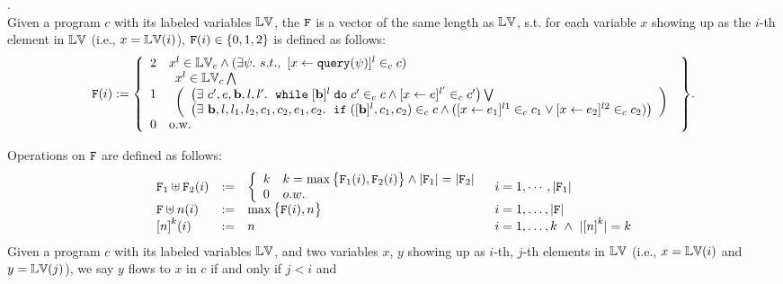 {
\begin{defn}.
\\
Given a program  ${c}$ with its labeled variables $\mathbb{LV}$, the $\mathtt{F}$ is a vector of the same length as $\mathbb{LV}$, s.t. for each variable ${x}$ showing up as the $i$-th element in $\mathbb{LV}$ (i.e., ${x} = \mathbb{LV}(i)$), 
$\mathtt{F}(i) \in \{0, 1, 2\}$ is defined as follows:
%
%
\[
\flag(i) := 
\left\{
\begin{array}{ll}
2 & 
{x^l} \in \lvar_{c} \land 
(\exists {\qexpr}. ~ s.t., ~
[\assign{{x}}{\query({\qexpr})}]^l \in_{c} {c})
\\
1 &  
\begin{array}{l}
{x^l} \in \lvar_{c} \bigwedge \\
\left(
\begin{array}{l}
\big(\exists  ~ {c'}, {\expr}, \sbexpr, l, l'. ~
	\ewhile [\sbexpr]^l \edo {c'} \in_{c} {c}
	\land 
	[{\assign{x}{\expr}}]^{l'} \in_{c}  {c'}
\big) \bigvee
\\
\big(\exists ~ \sbexpr, l, l_1, l_2, {c_1}, {c_2}, {\expr}_1, {\expr}_2. ~
	\eif([\sbexpr]^l, {c_1}, {c_2}) \in_{c} {c} \land
	([{\assign{x}{\expr_1}}]^{l1} \in_{c} {c_1} \lor 
	[{\assign{x}{\expr_2}}]^{l2} \in_{c} {c_2})
\big)
\end{array}
\right)
\end{array}
\\
0 & \text{o.w.}
\end{array}
\right\}. 
\] 
%
\end{defn}
%
Operations on $\mathtt{F}$ are defined as follows:
\begin{equation}
\begin{array}{llll}
{\flag_1 \uplus \flag_2}(i) & := &
\left\{
\begin{array}{ll}
k & k = \max{\big\{\flag_1(i), \flag_2(i)\big\}} 
\land |\flag_1| = |\flag_2|\\
0 & o.w.
\end{array}\right.
& i = 1, \cdots, |\flag_1|  
\\
{\flag \uplus n}(i) & := & 
\max\big\{ \flag(i), n \big\} 
& i = 1, \ldots, |\flag|    
\\
\left[ n \right]^k (i) & := &  n
& i = 1, \ldots, k ~ \land ~ |\left[ n \right]^k| = k
\end{array}
\end{equation}
%
Given a program  ${c}$ with its labeled variables $\mathbb{LV}$,
and two variables ${x}$, ${y}$ showing up as $i$-th, $j$-th elements in $\mathbb{LV}$ 
(i.e., ${x} = \mathbb{LV}(i)$ and ${y} = \mathbb{LV}(j)$),
we say ${y}$ flows to ${x}$ in ${c}$ if and only if $j < i$ and 
}

